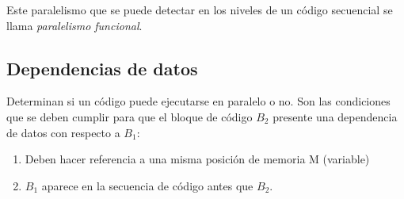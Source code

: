 \documentclass[10pt,a4paper,spanish]{report}
\begin{document}
Este paralelismo que se puede detectar en los niveles de un código secuencial se llama \textit{\textcolor[rgb]{0.2,0.4,0.8}{paralelismo funcional}}.

\textcolor[rgb]{0.2,0.4,0.8}{\subsection{Dependencias de datos}}
\label{dependencias_datos}
Determinan si un código puede ejecutarse en paralelo o no. Son las condiciones que se deben cumplir para que el bloque de código $B_2$ presente una dependencia de datos con respecto a $B_1$:
\begin{enumerate}[\color{azul}{\bf $\heartsuit$}]
    \item Deben hacer referencia a una misma posición de memoria M (variable)
    \item $B_1$ aparece en la secuencia de código antes que $B_2$.
\end{enumerate}
\end{document}
